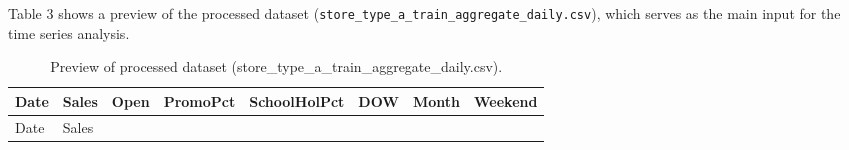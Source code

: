 \documentclass[
  12pt,
]{article}
\begin{document}
Table 3 shows a preview of the processed dataset
(\texttt{store\_type\_a\_train\_aggregate\_daily.csv}), which serves as
the main input for the time series analysis.

\begin{longtable}[]{@{}
  >{\raggedright\arraybackslash}p{}
  >{\raggedleft\arraybackslash}p{}
  >{\raggedleft\arraybackslash}p{}
  >{\raggedleft\arraybackslash}p{}
  >{\raggedleft\arraybackslash}p{}
  >{\raggedleft\arraybackslash}p{}
  >{\raggedleft\arraybackslash}p{}
  >{\raggedleft\arraybackslash}p{}@{}}
\caption{Preview of processed dataset
(store\_type\_a\_train\_aggregate\_daily.csv).}\tabularnewline
\toprule\noalign{}
\begin{minipage}[b]{\linewidth}\raggedright
Date
\end{minipage} & \begin{minipage}[b]{\linewidth}\raggedleft
Sales
\end{minipage} & \begin{minipage}[b]{\linewidth}\raggedleft
Open
\end{minipage} & \begin{minipage}[b]{\linewidth}\raggedleft
PromoPct
\end{minipage} & \begin{minipage}[b]{\linewidth}\raggedleft
SchoolHolPct
\end{minipage} & \begin{minipage}[b]{\linewidth}\raggedleft
DOW
\end{minipage} & \begin{minipage}[b]{\linewidth}\raggedleft
Month
\end{minipage} & \begin{minipage}[b]{\linewidth}\raggedleft
Weekend
\end{minipage} \\
\midrule\noalign{}
\endfirsthead
\toprule\noalign{}
\begin{minipage}[b]{\linewidth}\raggedright
Date
\end{minipage} & \begin{minipage}[b]{\linewidth}\raggedleft
Sales
\end{minipage} & \begin{minipage}[b]{\linewidth}\raggedleft

\end{minipage}
\end{longtable}
\end{document}
